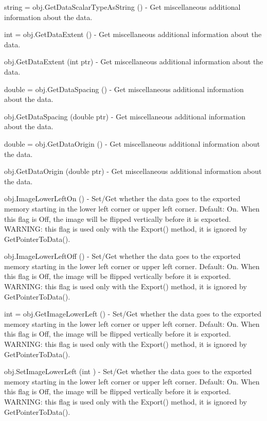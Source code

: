 \begin{DoxyItemize}
\item {\ttfamily string = obj.\-Get\-Data\-Scalar\-Type\-As\-String ()} -\/ Get miscellaneous additional information about the data.  
\item {\ttfamily int = obj.\-Get\-Data\-Extent ()} -\/ Get miscellaneous additional information about the data.  
\item {\ttfamily obj.\-Get\-Data\-Extent (int ptr)} -\/ Get miscellaneous additional information about the data.  
\item {\ttfamily double = obj.\-Get\-Data\-Spacing ()} -\/ Get miscellaneous additional information about the data.  
\item {\ttfamily obj.\-Get\-Data\-Spacing (double ptr)} -\/ Get miscellaneous additional information about the data.  
\item {\ttfamily double = obj.\-Get\-Data\-Origin ()} -\/ Get miscellaneous additional information about the data.  
\item {\ttfamily obj.\-Get\-Data\-Origin (double ptr)} -\/ Get miscellaneous additional information about the data.  
\item {\ttfamily obj.\-Image\-Lower\-Left\-On ()} -\/ Set/\-Get whether the data goes to the exported memory starting in the lower left corner or upper left corner. Default\-: On. When this flag is Off, the image will be flipped vertically before it is exported. W\-A\-R\-N\-I\-N\-G\-: this flag is used only with the Export() method, it is ignored by Get\-Pointer\-To\-Data().  
\item {\ttfamily obj.\-Image\-Lower\-Left\-Off ()} -\/ Set/\-Get whether the data goes to the exported memory starting in the lower left corner or upper left corner. Default\-: On. When this flag is Off, the image will be flipped vertically before it is exported. W\-A\-R\-N\-I\-N\-G\-: this flag is used only with the Export() method, it is ignored by Get\-Pointer\-To\-Data().  
\item {\ttfamily int = obj.\-Get\-Image\-Lower\-Left ()} -\/ Set/\-Get whether the data goes to the exported memory starting in the lower left corner or upper left corner. Default\-: On. When this flag is Off, the image will be flipped vertically before it is exported. W\-A\-R\-N\-I\-N\-G\-: this flag is used only with the Export() method, it is ignored by Get\-Pointer\-To\-Data().  
\item {\ttfamily obj.\-Set\-Image\-Lower\-Left (int )} -\/ Set/\-Get whether the data goes to the exported memory starting in the lower left corner or upper left corner. Default\-: On. When this flag is Off, the image will be flipped vertically before it is exported. W\-A\-R\-N\-I\-N\-G\-: this flag is used only with the Export() method, it is ignored by Get\-Pointer\-To\-Data().  

\end{DoxyItemize}
